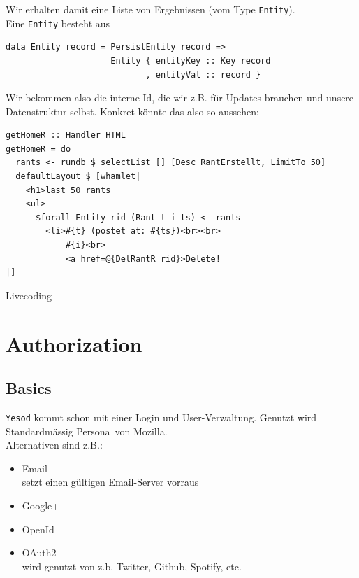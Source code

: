 \documentclass{beamer}
\begin{document}
\begin{frame}[fragile]
Wir erhalten damit eine Liste von Ergebnissen (vom Type \texttt{Entity}).\\\pause
Eine \texttt{Entity} besteht aus
\begin{verbatim}
data Entity record = PersistEntity record =>
                     Entity { entityKey :: Key record
                            , entityVal :: record }
\end{verbatim}
\pause
Wir bekommen also die interne Id, die wir z.B. für Updates brauchen und unsere Datenstruktur selbst. Konkret könnte das also so aussehen:
\begin{verbatim}
getHomeR :: Handler HTML
getHomeR = do
  rants <- rundb $ selectList [] [Desc RantErstellt, LimitTo 50]
  defaultLayout $ [whamlet|
    <h1>last 50 rants
    <ul>
      $forall Entity rid (Rant t i ts) <- rants
        <li>#{t} (postet at: #{ts})<br><br>
            #{i}<br>
            <a href=@{DelRantR rid}>Delete!
|]
\end{verbatim}
\end{frame}

\begin{frame}
Livecoding
\end{frame}

\section{Authorization}

\subsection{Basics}

\begin{frame}[fragile]
\texttt{Yesod} kommt schon mit einer Login und User-Verwaltung. Genutzt wird Standardmässig \glqq Persona\grqq \ von Mozilla.\\\pause
Alternativen sind z.B.:
\begin{itemize}
 \item Email\\
       setzt einen gültigen Email-Server vorraus
 \pause
 \item Google+
 \pause
 \item OpenId
 \pause
 \item OAuth2\\
       wird genutzt von z.b. Twitter, Github, Spotify, etc.
\end{itemize}
\end{frame}
\end{document}
